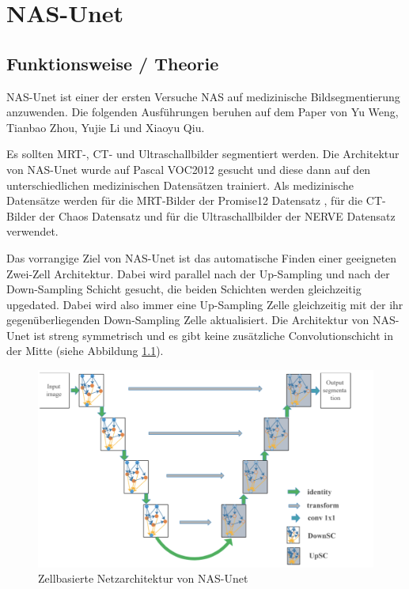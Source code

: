\chapter{NAS-Unet}
\label{ch:nasunet}



\section{Funktionsweise / Theorie}

NAS-Unet ist einer der ersten Versuche NAS auf medizinische Bildsegmentierung anzuwenden. Die folgenden Ausführungen beruhen auf dem Paper \cite{nasunetPaper} von Yu Weng, Tianbao Zhou, Yujie Li und Xiaoyu Qiu.

Es sollten MRT-, CT- und Ultraschallbilder segmentiert werden. Die Architektur von NAS-Unet wurde auf Pascal VOC2012 \cite{PascalVOCDatensatz} gesucht und diese dann auf den unterschiedlichen medizinischen Datensätzen trainiert. Als medizinische Datensätze werden für die MRT-Bilder der Promise12 Datensatz \cite{Promise12Datensatz}, für die CT-Bilder der Chaos Datensatz \cite{ChaosDatensatz} und für die Ultraschallbilder der NERVE Datensatz \cite{NerveDatensatz} verwendet. 

Das vorrangige Ziel von NAS-Unet ist das automatische Finden einer geeigneten Zwei-Zell Architektur. Dabei wird parallel nach der Up-Sampling und nach der Down-Sampling Schicht gesucht, die beiden Schichten werden gleichzeitig upgedated. Dabei wird also immer eine Up-Sampling Zelle gleichzeitig mit der ihr gegenüberliegenden Down-Sampling Zelle aktualisiert. Die Architektur von NAS-Unet ist streng symmetrisch und es gibt keine zusätzliche Convolutionschicht in der Mitte (siehe Abbildung \ref{pic:nasUnet_ArchitekturGesamt}). 

\begin{figure}[H]
	
	\centering
	\includegraphics[scale=0.25]{Pictures/nasUnet/Bild1.png}
	\caption{Zellbasierte Netzarchitektur von NAS-Unet \cite{nasunetPaper} }
	\label{pic:nasUnet_ArchitekturGesamt}
\end{figure}

